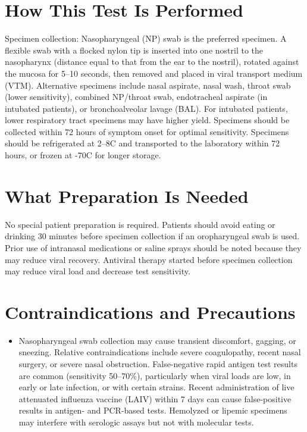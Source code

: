 \section*{How This Test Is Performed}
Specimen collection: Nasopharyngeal (NP) swab is the preferred specimen. A flexible swab with a flocked nylon tip is inserted into one nostril to the nasopharynx (distance equal to that from the ear to the nostril), rotated against the mucosa for 5--10 seconds, then removed and placed in viral transport medium (VTM). Alternative specimens include nasal aspirate, nasal wash, throat swab (lower sensitivity), combined NP/throat swab, endotracheal aspirate (in intubated patients), or bronchoalveolar lavage (BAL). For intubated patients, lower respiratory tract specimens may have higher yield. Specimens should be collected within 72 hours of symptom onset for optimal sensitivity. Specimens should be refrigerated at 2--8\textdegree{}C and transported to the laboratory within 72 hours, or frozen at -70\textdegree{}C for longer storage.

\section*{What Preparation Is Needed}
No special patient preparation is required. Patients should avoid eating or drinking 30 minutes before specimen collection if an oropharyngeal swab is used. Prior use of intranasal medications or saline sprays should be noted because they may reduce viral recovery. Antiviral therapy started before specimen collection may reduce viral load and decrease test sensitivity.

\section*{Contraindications and Precautions}
\begin{itemize}
  \item Nasopharyngeal swab collection may cause transient discomfort, gagging, or sneezing. Relative contraindications include severe coagulopathy, recent nasal surgery, or severe nasal obstruction. False-negative rapid antigen test results are common (sensitivity 50--70\%), particularly when viral loads are low, in early or late infection, or with certain strains. Recent administration of live attenuated influenza vaccine (LAIV) within 7 days can cause false-positive results in antigen- and PCR-based tests. Hemolyzed or lipemic specimens may interfere with serologic assays but not with molecular tests.
\end{itemize}
